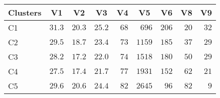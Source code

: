 \begin{table}[!tbp]
\begin{center}
\begin{tabular}{lrrrrrrrr}
\hline\hline
\multicolumn{1}{c}{Clusters}&\multicolumn{1}{c}{V1}&\multicolumn{1}{c}{V2}&\multicolumn{1}{c}{V3}&\multicolumn{1}{c}{V4}&\multicolumn{1}{c}{V5}&\multicolumn{1}{c}{V6}&\multicolumn{1}{c}{V8}&\multicolumn{1}{c}{V9}\tabularnewline
\hline
C1&$31.3$&$20.3$&$25.2$&$68$&$ 696$&$206$&$20$&$32$\tabularnewline
C2&$29.5$&$18.7$&$23.4$&$73$&$1159$&$185$&$37$&$29$\tabularnewline
C3&$28.2$&$17.2$&$22.0$&$74$&$1518$&$180$&$50$&$29$\tabularnewline
C4&$27.5$&$17.4$&$21.7$&$77$&$1931$&$152$&$62$&$21$\tabularnewline
C5&$29.6$&$20.6$&$24.4$&$82$&$2645$&$ 96$&$82$&$ 9$\tabularnewline
\hline
\end{tabular}\end{center}

\end{table}
